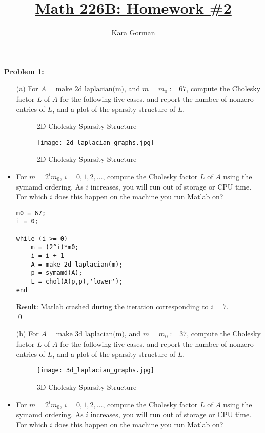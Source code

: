 \documentclass[12pt]{article}
\title{\underline{Math 226B: Homework \#2}}
\author{\huge Kara Gorman}
\begin{document}
\maketitle


\bigskip\bigskip
\noindent
\textbf{Problem 1:}

\begin{itemize}

\item[(a)] For $A = \text{make\_2d\_laplacian(m)}$, and $m = m_0 := 67$, compute the Cholesky factor $L$ of $A$ for the following five cases, and report the number of nonzero entries of $L$, and a plot of the sparsity structure of $L$.

\begin{figure}[H]
\center
\caption{2D Cholesky Sparsity Structure}
\texttt{[image: 2d\_laplacian\_graphs.jpg]}
\caption{2D Cholesky Sparsity Structure}
\end{figure}

\item For $m = 2^i m_0$, $i = 0,1,2, \dots$, compute the Cholesky factor $L$ of $A$ using the symamd ordering.  As $i$ increases, you will run out of storage or CPU time.  For which $i$ does this happen on the machine you run Matlab on?\\

\lstset{language=matlab,frame=single}
\begin{lstlisting}[caption=Matlab Code to for when 2D Cholesky Quits]
m0 = 67;
i = 0;

while (i >= 0)
    m = (2^i)*m0;
    i = i + 1
    A = make_2d_laplacian(m);
    p = symamd(A);
    L = chol(A(p,p),'lower');
end
\end{lstlisting}

\underline{Result:} Matlab crashed during the iteration corresponding to $i = 7$.\\
\qed


\item[(b)] For $A = \text{make\_3d\_laplacian(m)}$, and $m = m_0 := 37$, compute the Cholesky factor $L$ of $A$ for the following five cases, and report the number of nonzero entries of $L$, and a plot of the sparsity structure of $L$.

\begin{figure}[H]
\center
\texttt{[image: 3d\_laplacian\_graphs.jpg]}
\caption{3D Cholesky Sparsity Structure}
\end{figure}

\item For $m = 2^i m_0$, $i = 0,1,2, \dots$, compute the Cholesky factor $L$ of $A$ using the symamd ordering.  As $i$ increases, you will run out of storage or CPU time.  For which $i$ does this happen on the machine you run Matlab on?\\


\end{itemize}
\end{document}
